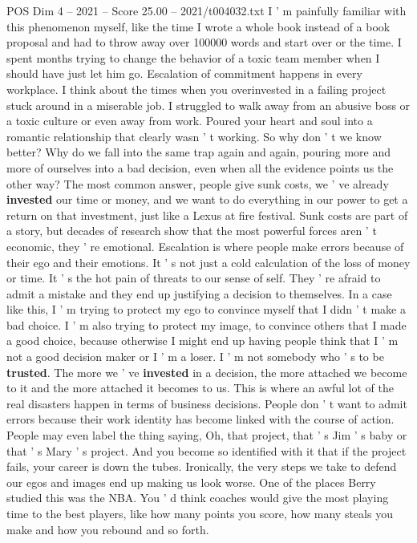 \begin{textsample}{POS Dim 4 – 2021 – Score 25.00 – 2021/t004032.txt}
I ' m painfully familiar with this phenomenon myself, like the time I wrote a whole book instead of a book proposal and had to throw away over 100000 words and start over or the time.
I spent months trying to change the behavior of a toxic team member when I should have just let him go.
Escalation of commitment happens in every workplace.
I think about the times when you overinvested in a failing project stuck around in a miserable job.
I struggled to walk away from an abusive boss or a toxic culture or even away from work.
Poured your heart and soul into a romantic relationship that clearly wasn ' t working.
So why don ' t we know better?
Why do we fall into the same trap again and again, pouring more and more of ourselves into a bad decision, even when all the evidence points us the other way?
The most common answer, people give sunk costs, we ' ve already \textbf{invested} our time or money, and we want to do everything in our power to get a return on that investment, just like a Lexus at fire festival.
Sunk costs are part of a story, but decades of research show that the most powerful forces aren ' t economic, they ' re emotional.
Escalation is where people make errors because of their ego and their emotions.
It ' s not just a cold calculation of the loss of money or time.
It ' s the hot pain of threats to our sense of self.
They ' re afraid to admit a mistake and they end up justifying a decision to themselves.
In a case like this, I ' m trying to protect my ego to convince myself that I didn ' t make a bad choice.
I ' m also trying to protect my image, to convince others that I made a good choice, because otherwise I might end up having people think that I ' m not a good decision maker or I ' m a loser.
I ' m not somebody who ' s to be \textbf{trusted}.
The more we ' ve \textbf{invested} in a decision, the more attached we become to it and the more attached it becomes to us.
This is where an awful lot of the real disasters happen in terms of business decisions.
People don ' t want to admit errors because their work identity has become linked with the course of action.
People may even label the thing saying, Oh, that project, that ' s Jim ' s baby or that ' s Mary ' s project.
And you become so identified with it that if the project fails, your career is down the tubes.
Ironically, the very steps we take to defend our egos and images end up making us look worse.
One of the places Berry studied this was the NBA.
You ' d think coaches would give the most playing time to the best players, like how many points you score, how many steals you make and how you rebound and so forth.

\end{textsample}
